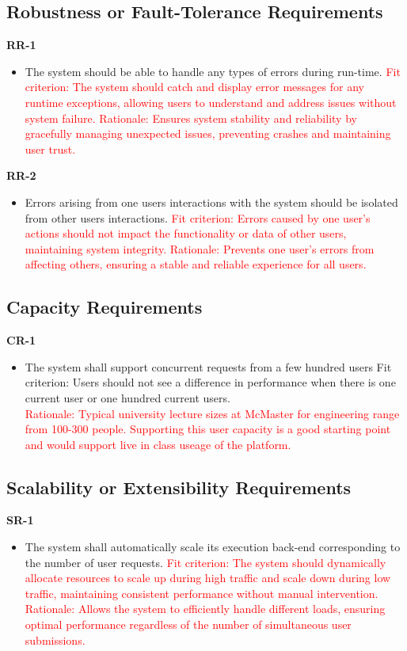 \documentclass[12pt]{article}
\begin{document}
\subsection{Robustness or Fault-Tolerance Requirements}
\textbf{RR-1}
\begin{itemize}
    \item The system should be able to handle any types of errors during run-time.\hfill \break
    \textcolor{red} {Fit criterion: The system should catch and display error messages for any runtime exceptions, allowing users to understand and address issues without system failure.}
    \hfill \break
    \textcolor{red} {Rationale: Ensures system stability and reliability by gracefully managing unexpected issues, preventing crashes and maintaining user trust.}
\end{itemize}
\textbf{RR-2}
\begin{itemize}
    \item Errors arising from one users interactions with the system should be isolated from other users interactions.\hfill \break
    \textcolor{red} {Fit criterion: Errors caused by one user's actions should not impact the functionality or data of other users, maintaining system integrity.}
    \hfill \break
    \textcolor{red} {Rationale: Prevents one user's errors from affecting others, ensuring a stable and reliable experience for all users.}
\end{itemize}

\subsection{Capacity Requirements}
\textbf{CR-1}
\begin{itemize}
    \item The system shall support concurrent requests from a few hundred users \hfill \break
    Fit criterion: Users should not see a difference in performance when there is one current user or one hundred current users. \\
    \textcolor{red} {Rationale: Typical university lecture sizes at McMaster for engineering range from 100-300 people. Supporting this user capacity is a good starting point and would support live in class useage of the platform.}
\end{itemize}

\subsection{Scalability or Extensibility Requirements}
\textbf{SR-1}
\begin{itemize}
    \item The system shall automatically scale its execution back-end corresponding to the number of user requests. \hfill \break
    \textcolor{red} {Fit criterion: The system should dynamically allocate resources to scale up during high traffic and scale down during low traffic, maintaining consistent performance without manual intervention.} \hfill \break
    \textcolor{red} {Rationale: Allows the system to efficiently handle different loads, ensuring optimal performance regardless of the number of simultaneous user submissions.}
\end{itemize}
\end{document}
